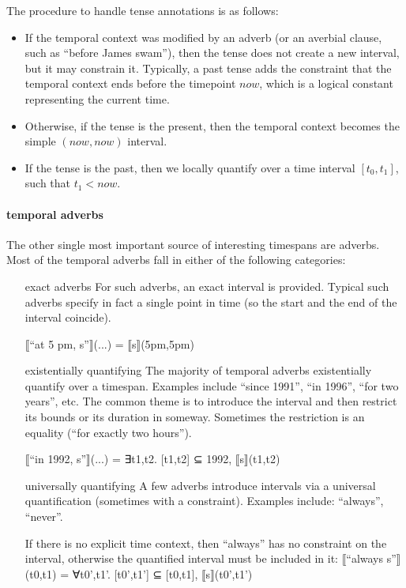 \documentclass[a4paper,11pt]{article}
\begin{document}
The procedure to handle tense annotations is as follows:
\begin{itemize}
\item If the temporal context was modified by an adverb (or an
  averbial clause, such as ``before James swam''), then the tense does
  not create a new interval, but it may constrain it. Typically, a
  past tense adds the constraint that the temporal context ends before
  the timepoint $now$, which is a logical constant representing the current
  time.
\item Otherwise, if the tense is the present, then the temporal
  context becomes the simple $(now,now)$ interval.
\item
  If the tense is the past, then we locally quantify over a time
  interval $[t_0,t_1]$, such that $t_1 < now$.
\end{itemize}

\paragraph{temporal adverbs}

The other single most important source of interesting timespans are
adverbs. Most of the temporal adverbs fall in either of the following
categories:

\begin{enumerate}
\item[exact adverbs] For such adverbs, an exact interval is
  provided. Typical such adverbs specify in fact a single point in
  time (so the start and the end of the interval coincide).

  ⟦``at 5 pm, s''⟧(...) = ⟦s⟧(5pm,5pm)

\item[existentially quantifying] The majority of temporal adverbs
  existentially quantify over a timespan. Examples include ``since
  1991'', ``in 1996'', ``for two years'', etc. The common theme is to
  introduce the interval and then restrict its bounds or its duration
  in someway. Sometimes the restriction is an equality (``for exactly
  two hours'').

  ⟦``in 1992, s''⟧(...) = ∃t1,t2.  [t1,t2] ⊆ 1992, ⟦s⟧(t1,t2)

\item[universally quantifying] A few adverbs introduce intervals via a
  universal quantification (sometimes with a constraint). Examples
  include: ``always'', ``never''.

  If there is no explicit time context, then ``always'' has no
  constraint on the interval, otherwise the quantified interval must
  be included in it:
  ⟦``always s''⟧(t0,t1) = ∀t0',t1'. [t0',t1'] ⊆ [t0,t1], ⟦s⟧(t0',t1')


\end{enumerate}
\end{document}
